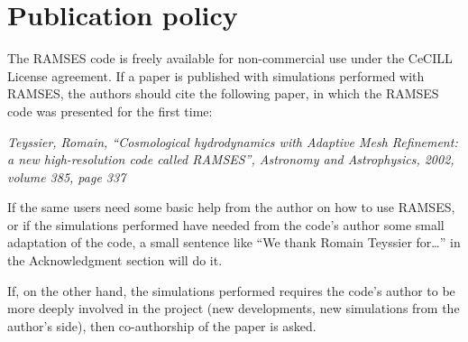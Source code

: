 \clearpage
\section{Publication policy}

The RAMSES code is freely available for non-commercial use under the
CeCILL License agreement. If a paper is published with simulations
performed with RAMSES, the authors should cite the following paper, in
which the RAMSES code was presented for the first time:

{ \itshape
Teyssier, Romain, ``Cosmological hydrodynamics with Adaptive Mesh
Refinement: a new high-resolution code called RAMSES'', Astronomy and
Astrophysics, 2002, volume 385, page 337 }

If the same users need some basic help from the author on how to use
RAMSES, or if the simulations performed have needed from the code's
author some small adaptation of the code, a small sentence like ``We
thank Romain Teyssier for{\dots}'' in the Acknowledgment section will do
it.

If, on the other hand, the simulations performed requires the code's
author to be more deeply involved in the project (new developments, new
simulations from the author's side), then co-authorship of the paper is
asked.
